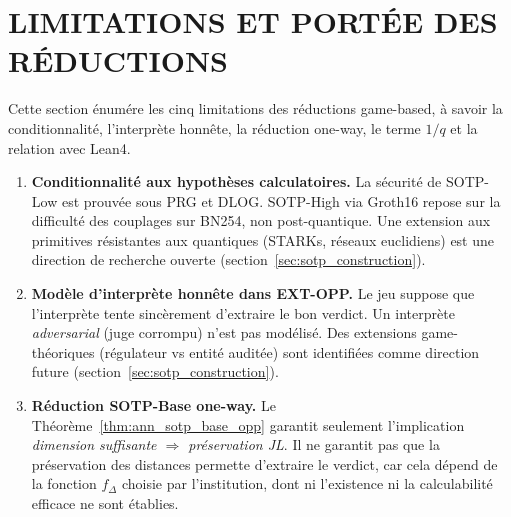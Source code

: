 \section{LIMITATIONS ET PORT\'EE DES R\'EDUCTIONS}
\label{sec:gamebased_limitations}
\begin{sloppypar}

Cette section \'enum\'ere les cinq limitations des r\'eductions game-based, \`a savoir la
conditionnalit\'e, l'interpr\`ete honn\^ete, la r\'eduction one-way, le terme $1/q$
et la relation avec Lean4.

\begin{enumerate}
\item \textbf{Conditionnalit\'e aux hypoth\`eses calculatoires.}
      La s\'ecurit\'e de SOTP-Low est prouv\'ee sous PRG et DLOG.
      SOTP-High via Groth16 repose sur la difficult\'e des
      couplages sur BN254, non post-quantique. Une extension aux
      primitives r\'esistantes aux quantiques (STARKs, r\'eseaux
      euclidiens) est une direction de recherche ouverte (section~\ref{sec:sotp_construction}).

\item \textbf{Mod\`ele d'interpr\`ete honn\^ete dans EXT-OPP.}
      Le jeu suppose que l'interpr\`ete tente sinc\`erement d'extraire
      le bon verdict. Un interpr\`ete \emph{adversarial} (juge
      corrompu) n'est pas mod\'elis\'e. Des extensions game-th\'eoriques
      (r\'egulateur vs entit\'e audit\'ee) sont identifi\'ees comme
      direction future (section~\ref{sec:sotp_construction}).

\item \textbf{R\'eduction SOTP-Base one-way.}
      Le Th\'eor\`eme~\ref{thm:ann_sotp_base_opp} garantit seulement l'implication
      \textit{dimension suffisante $\Rightarrow$ pr\'eservation JL}. Il ne garantit
      pas que la pr\'eservation des distances permette d'extraire le verdict,
      car cela d\'epend de la fonction $f_\Delta$ choisie par l'institution, dont ni
      l'existence ni la calculabilit\'e efficace ne sont \'etablies.


\end{enumerate}
\end{sloppypar}

